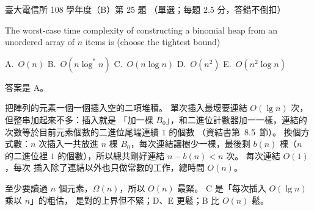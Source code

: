 \begin{pastexam}[label={px:ntu-108-comm-dsab-25}]{臺大電信所 108 學年度（B）第 25 題}
（單選；每題 2.5 分，答錯不倒扣）

The worst-case time complexity of constructing a binomial heap from an unordered array of $n$
items is (choose the tightest bound)

A.~$O(n)$ \qquad B.~$O(n\log^* n)$ \qquad C.~$O(n\log n)$ \qquad D.~$O(n^2)$ \qquad
E.~$O(n^2\log n)$
\end{pastexam}

\begin{pastsoln}
答案是 A。

把陣列的元素一個一個插入空的二項堆積。 單次插入最壞要連結 $O(\lg n)$ 次，但整串加起來不多：插入就是
「加一棵 $B_0$」，和二進位計數器加一一樣，連結的次數等於目前元素個數的二進位尾端連續 $1$ 的個數
（資結書第~8.5~節）。 換個方式數：$n$ 次插入一共放進 $n$ 棵 $B_0$，每次連結讓樹少一棵，最後剩
$b(n)$ 棵（$n$ 的二進位裡 $1$ 的個數），所以總共剛好連結 $n - b(n) < n$ 次。 每次連結 $O(1)$，每次
插入除了連結以外也只做常數的工作，總時間 $O(n)$。

至少要讀過 $n$ 個元素，$\Omega(n)$，所以 $O(n)$ 最緊。 C 是「每次插入 $O(\lg n)$ 乘以 $n$」的粗估，
是對的上界但不緊；D、E 更鬆；B 比 $O(n)$ 鬆。
\end{pastsoln}
